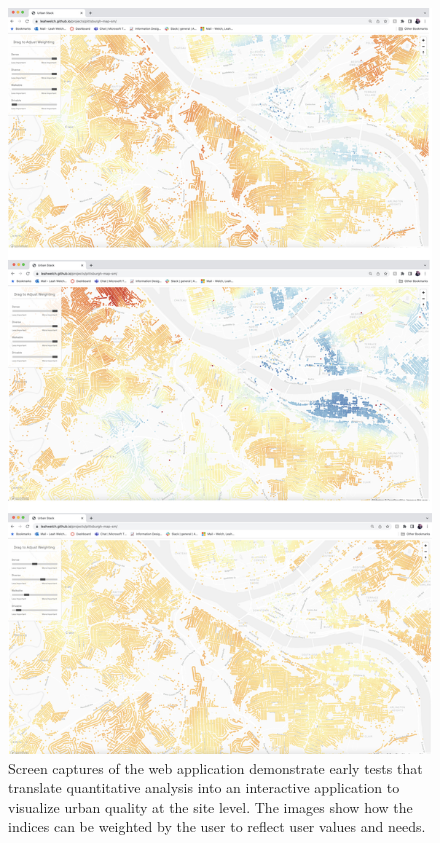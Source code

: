 \documentclass[
]{book}
\begin{document}
\begin{figure}
\includegraphics[width=1\linewidth]{04_figures/fig_7a} \caption{Screen captures of the web application demonstrate early tests that translate quantitative analysis into an interactive application to visualize urban quality at the site level. The images show how the indices can be weighted by the user to reflect user values and needs.}\label{fig:fig7a}
\end{figure}
\end{document}
